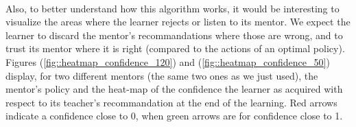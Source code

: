 \documentclass[a4paper]{report}
\begin{document}
{{{{				\paragraph{} Also, to better understand how this algorithm works, it would be interesting to visualize the areas where the learner rejects or listen to its mentor. We expect the learner to discard the mentor's recommandations where those are wrong, and to trust its mentor where it is right (compared to the actions of an optimal policy). Figures (\ref{fig::heatmap_confidence_120}) and (\ref{fig::heatmap_confidence_50}) display, for two different mentors (the same two ones as we just used), the mentor's policy and the heat-map of the confidence the learner as acquired with respect to its teacher's recommandation at the end of the learning. Red arrows indicate a confidence close to 0, when green arrows are for confidence close to 1. 
				
}}}}
\end{document}
